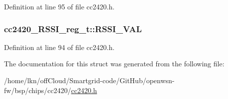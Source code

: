 Definition at line 95 of file cc2420.\+h.

\subsubsection[{\texorpdfstring{R\+S\+S\+I\+\_\+\+V\+AL}{RSSI_VAL}}]{ cc2420\+\_\+\+R\+S\+S\+I\+\_\+reg\+\_\+t\+::\+R\+S\+S\+I\+\_\+\+V\+AL}\hypertarget{structcc2420___r_s_s_i__reg__t_a6e2411ab9a12bd709d7933049a5d1186}{}\label{structcc2420___r_s_s_i__reg__t_a6e2411ab9a12bd709d7933049a5d1186}


Definition at line 94 of file cc2420.\+h.



The documentation for this struct was generated from the following file\+:\begin{DoxyCompactItemize}
\item 
/home/lkn/off\+Cloud/\+Smartgrid-\/code/\+Git\+Hub/openwsn-\/fw/bsp/chips/cc2420/\hyperlink{cc2420_8h}{cc2420.\+h}\end{DoxyCompactItemize}
